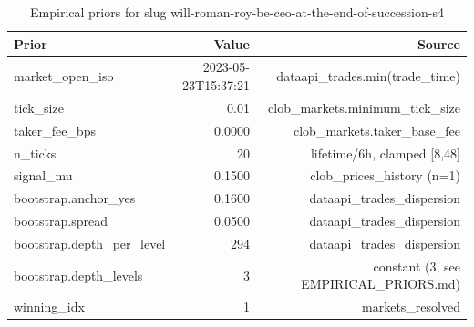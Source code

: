 \begin{table}[ht]
\centering
\caption{Empirical priors for slug will-roman-roy-be-ceo-at-the-end-of-succession-s4}
\label{tab:priors_summary}
\begin{tabular}{lrr}
\toprule
Prior & Value & Source \\
\midrule
market_open_iso & 2023-05-23T15:37:21 & dataapi_trades.min(trade_time) \\
tick_size & 0.01 & clob_markets.minimum_tick_size \\
taker_fee_bps & 0.0000 & clob_markets.taker_base_fee \\
n_ticks & 20 & lifetime/6h, clamped [8,48] \\
signal_mu & 0.1500 & clob_prices_history (n=1) \\
bootstrap.anchor_yes & 0.1600 & dataapi_trades_dispersion \\
bootstrap.spread & 0.0500 & dataapi_trades_dispersion \\
bootstrap.depth_per_level & 294 & dataapi_trades_dispersion \\
bootstrap.depth_levels & 3 & constant (3, see EMPIRICAL_PRIORS.md) \\
winning_idx & 1 & markets_resolved \\
\bottomrule
\end{tabular}
\end{table}
